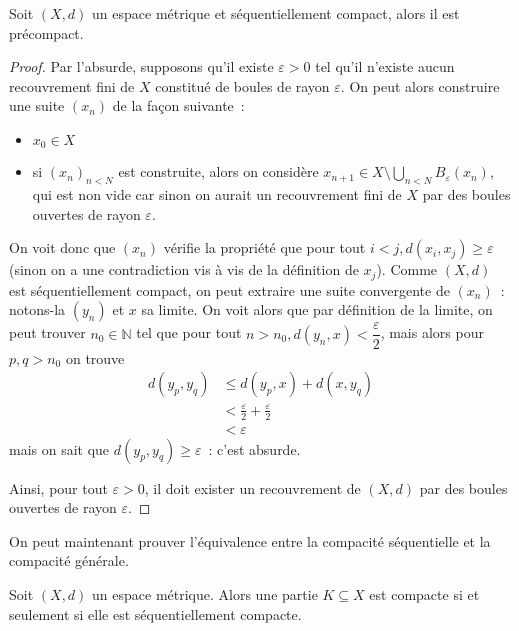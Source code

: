 \begin{lemma}\label{lem.precomp}
  Soit $(X,d)$ un espace métrique et séquentiellement compact, alors il est
  précompact.
\end{lemma}

\begin{proof}
  Par l'absurde, supposons qu'il existe $\varepsilon > 0$ tel qu'il n'existe
  aucun recouvrement fini de $X$ constitué de boules de rayon $\varepsilon$.
  On peut alors construire une suite $(x_n)$ de la façon suivante~:
  \begin{itemize}
  \item $x_0 \in X$
  \item si $(x_n)_{n < N}$ est construite, alors on considère
    $\displaystyle x_{n+1}\in X\setminus \bigcup_{n < N} B_\varepsilon(x_n)$, qui
    est non vide car sinon on aurait un recouvrement fini de $X$ par des boules
    ouvertes de rayon $\varepsilon$.
  \end{itemize}
  On voit donc que $(x_n)$ vérifie la propriété que pour tout
  $i < j, d(x_i,x_j) \geq \varepsilon$ (sinon on a une contradiction vis à vis
  de la définition de $x_j$). Comme $(X,d)$ est séquentiellement compact, on
  peut extraire une suite convergente de $(x_n)$~: notons-la $(y_n)$ et $x$ sa
  limite. On voit alors que par définition de la limite, on peut trouver
  $n_0\in\mathbb N$ tel que pour tout
  $n > n_0, d(y_n,x) < \dfrac{\varepsilon}{2}$, mais alors pour $p,q > n_0$ on
  trouve
  \begin{align*}
    d(y_p,y_q) &\leq d(y_p,x) + d(x,y_q)\\
    &< \frac\varepsilon 2 + \frac\varepsilon 2\\
    &< \varepsilon
  \end{align*}
  mais on sait que $d(y_p,y_q) \geq \varepsilon$~: c'est absurde.

  Ainsi, pour tout $\varepsilon > 0$, il doit exister un recouvrement de $(X,d)$
  par des boules ouvertes de rayon $\varepsilon$.
\end{proof}

On peut maintenant prouver l'équivalence entre la compacité séquentielle et la
compacité générale.

\begin{theorem}
  Soit $(X,d)$ un espace métrique. Alors une partie $K\subseteq X$ est compacte
  si et seulement si elle est séquentiellement compacte.
\end{theorem}

